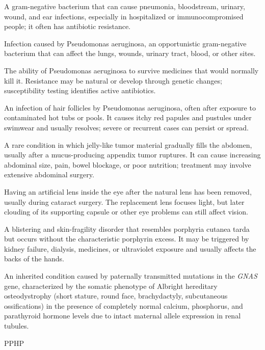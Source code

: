  A gram-negative bacterium that can cause pneumonia, bloodstream, urinary, wound, and ear infections, especially in hospitalized or immunocompromised people; it often has antibiotic resistance.

 Infection caused by Pseudomonas aeruginosa, an opportunistic gram-negative bacterium
that can affect the lungs, wounds, urinary tract, blood, or other sites.

 The ability of Pseudomonas aeruginosa to survive medicines that would normally kill it. Resistance may be natural or develop through genetic changes; susceptibility testing identifies active antibiotics.

 An infection of hair follicles by Pseudomonas aeruginosa, often after exposure to contaminated hot tubs or pools. It causes itchy red papules and pustules under swimwear and usually resolves; severe or recurrent cases can persist or spread.

 A rare condition in which jelly-like tumor material gradually fills the abdomen, usually after a mucus-producing appendix tumor ruptures. It can cause increasing abdominal size, pain, bowel blockage, or poor nutrition; treatment may involve extensive abdominal surgery.

 Having an artificial lens inside the eye after the natural lens has been removed, usually during cataract surgery. The replacement lens focuses light, but later clouding of its supporting capsule or other eye problems can still affect vision.

 A blistering and skin-fragility disorder that resembles porphyria cutanea tarda but occurs without the characteristic porphyrin excess. It may be triggered by kidney failure, dialysis, medicines, or ultraviolet exposure and usually affects the backs of the hands.

 An inherited condition caused by paternally transmitted mutations in the \textit{GNAS} gene, characterized by the somatic phenotype of Albright hereditary osteodystrophy (short stature, round face, brachydactyly, subcutaneous ossifications) in the presence of completely normal calcium, phosphorus, and parathyroid hormone levels due to intact maternal allele expression in renal tubules.

\synonyms
PPHP

